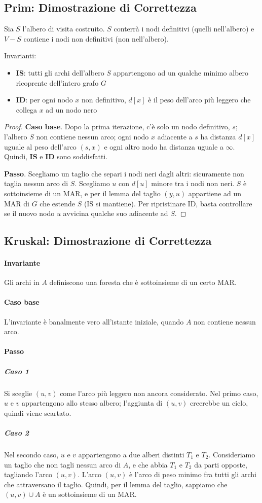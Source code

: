 \documentclass[11pt]{article}
\begin{document}
\subsection*{Prim: Dimostrazione di Correttezza}
Sia $S$ l'albero di visita costruito. $S$ conterrà i nodi definitivi (quelli nell'albero) e $V-S$ contiene i nodi non 
definitivi (non nell'albero). 

Invarianti:
\begin{itemize}
    \item \textbf{IS}: tutti gli archi dell'albero $S$ appartengono ad un qualche minimo albero ricoprente dell'intero 
    grafo $G$
    \item \textbf{ID}: per ogni nodo $x$ non definitivo, $d[x]$ è il peso dell'arco più leggero che collega $x$ ad un nodo 
    nero 
\end{itemize}

\begin{proof}
    \textbf{Caso base}. Dopo la prima iterazione, c'è solo un nodo definitivo, $s$; l'albero $S$ non contiene nessun arco; 
    ogni nodo $x$ adiacente a $s$ ha distanza $d[x]$ uguale al peso dell'arco $(s,x)$ e ogni altro nodo ha distanza uguale 
    a $\infty$. Quindi, \textbf{IS} e \textbf{ID} sono soddisfatti.

    \textbf{Passo}. Scegliamo un taglio che separi i nodi neri dagli altri: sicuramente non taglia nessun arco di $S$.
    Scegliamo $u$ con $d[u]$ minore tra i nodi non neri. $S$ è sottoinsieme di un MAR, e per il lemma del taglio $(y,u)$ 
    appartiene ad un MAR di $G$ che estende $S$ (IS si mantiene). Per ripristinare ID, basta controllare se il nuovo nodo 
    $u$ avvicina qualche suo adiacente ad $S$.
\end{proof}
\subsection*{Kruskal: Dimostrazione di Correttezza}
\paragraph*{Invariante}
Gli archi in $A$ definiscono una foresta che è sottoinsieme di un certo MAR.
\paragraph*{Caso base}
L'invariante è banalmente vero all'istante iniziale, quando $A$ non contiene nessun arco.
\paragraph*{Passo}
\subparagraph*{Caso 1}
Si sceglie $(u,v)$ come l'arco più leggero non ancora considerato. Nel primo caso, $u$ e $v$ appartengono allo stesso 
albero; l'aggiunta di $(u,v)$ creerebbe un ciclo, quindi viene scartato.
\subparagraph*{Caso 2}
Nel secondo caso, $u$ e $v$ appartengono a due alberi distinti $T_1$ e $T_2$. Consideriamo un taglio che non tagli nessun 
arco di $A$, e che abbia $T_1$ e $T_2$ da parti opposte, tagliando l'arco $(u,v)$. L'arco $(u,v)$ è l'arco di peso minimo 
fra tutti gli archi che attraversano il taglio. Quindi, per il lemma del taglio, sappiamo che $(u,v)\cup A$ è un sottoinsieme 
di un MAR.
\end{document}
